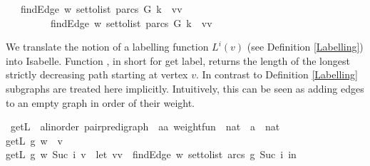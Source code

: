 \begin{isabellebody}
\ \ \ {\isachardoublequoteopen}{\isacharparenleft}findEdge\ w\ {\isacharparenleft}set{\isacharunderscore}to{\isacharunderscore}list\ {\isacharparenleft}parcs\ G{\isacharparenright}{\isacharparenright}\ k{\isacharparenright}\ {\isacharequal}\ {\isacharparenleft}vv\ \isanewline
\ \ \ \ \ \ \ \ {\isasymor}\ {\isacharparenleft}findEdge\ w\ {\isacharparenleft}set{\isacharunderscore}to{\isacharunderscore}list\ {\isacharparenleft}parcs\ G{\isacharparenright}{\isacharparenright}\ k{\isacharparenright}\ {\isacharequal}\ {\isacharparenleft}vv%
\isadelimproof
%
\endisadelimproof
%
\isatagproof
%
\endisatagproof
{\isafoldproof}%
%
\isadelimproof
%
\endisadelimproof
%
\isadelimproof
%
\endisadelimproof
%
\isatagproof
%
\endisatagproof
{\isafoldproof}%
%
\isadelimproof
%
\endisadelimproof
%
\isadelimproof
%
\endisadelimproof
%
\isatagproof
%
\endisatagproof
{\isafoldproof}%
%
\isadelimproof
%
\endisadelimproof
%
\begin{isamarkuptext}%
We translate the notion of a labelling function $L^i(v)$ (see Definition \ref{Labelling}) into Isabelle.
Function , in short for get label, returns the length of the longest strictly decreasing
path starting at vertex $v$. In contrast to Definition \ref{Labelling} subgraphs are treated here implicitly. Intuitively,
this can be seen as adding edges to an empty graph in order of their weight.%
\end{isamarkuptext}\isamarkuptrue%
\isamarkupfalse%
\ getL\ {\isacharcolon}{\isacharcolon}\ {\isachardoublequoteopen}{\isacharparenleft}{\isacharprime}a{\isacharcolon}{\isacharcolon}linorder{\isacharparenright}\ pair{\isacharunderscore}pre{\isacharunderscore}digraph\ {\isasymRightarrow}\ {\isacharparenleft}{\isacharprime}a{\isasymtimes}{\isacharprime}a{\isacharparenright}\ weight{\isacharunderscore}fun\ {\isasymRightarrow}\ nat\ {\isasymRightarrow}\ {\isacharprime}a\ {\isasymRightarrow}\ nat{\isachardoublequoteclose}\ \isanewline
{\isachardoublequoteopen}getL\ g\ w\ {}\ v\ {\isacharequal}\ {}{\isachardoublequoteclose}\ {\isacharbar}\ \ \isanewline
{\isachardoublequoteopen}getL\ g\ w\ {\isacharparenleft}Suc\ i{\isacharparenright}\ v\ {\isacharequal}\ {\isacharparenleft}let\ {\isacharparenleft}vv\ {\isacharequal}\ {\isacharparenleft}findEdge\ w\ {\isacharparenleft}set{\isacharunderscore}to{\isacharunderscore}list\ {\isacharparenleft}arcs\ g{\isacharparenright}{\isacharparenright}\ {\isacharparenleft}Suc\ i{\isacharparenright}{\isacharparenright}\ in\ \isanewline

\end{isabellebody}
